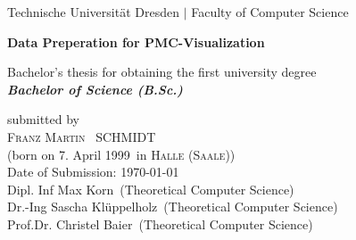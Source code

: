 \documentclass[a4paper,12pt,leqno]{article}
\newcommand{\name}{Schmidt}
\newcommand{\vorname}{Franz Martin}
\newcommand{\gebdatum}{7. April 1999}
\newcommand{\ort}{Halle (Saale)}
\newcommand{\betreuer}{Dipl. Inf Max Korn}
\newcommand{\gutachtereins}{Dr.-Ing Sascha Klüppelholz}
\newcommand{\gutachterzwei}{Prof.Dr. Christel Baier}
\newcommand{\institut}{Theoretical Computer Science}
\newcommand{\thema}{Data Preperation for PMC-Visualization}
\newcommand{\datum}{\today} %
\begin{document}

\begin{titlepage}

\thispagestyle{empty}

\begin{center}

	
{\Large Technische Universit\"{a}t Dresden $\mid$ Faculty of Computer Science}

\vfil\vfil

{\bfseries\Huge\thema}

\vfil\vfil
{\LARGE
Bachelor's thesis for obtaining the first university degree \\[\bigskipamount]
\bfseries{\itshape Bachelor of Science (B.Sc.)}\\[\bigskipamount]
}

\vfil\vfil

\vfil

\vspace{1cm}

submitted by
\\[\bigskipamount]
\textsc{\vorname\ } \MakeUppercase{\name}
\\[\bigskipamount]
(born on \gebdatum\ in \textsc{\ort})
\\[\bigskipamount]
Date of Submission: \datum
\\[\bigskipamount]
\betreuer\ (\institut)
\\[\smallskipamount]
\gutachtereins\ (\institut)
\\[\smallskipamount]
\gutachterzwei\ (\institut)
\vspace{-3cm}
\end{center}
\end{titlepage}
%
%
%
\end{document}
